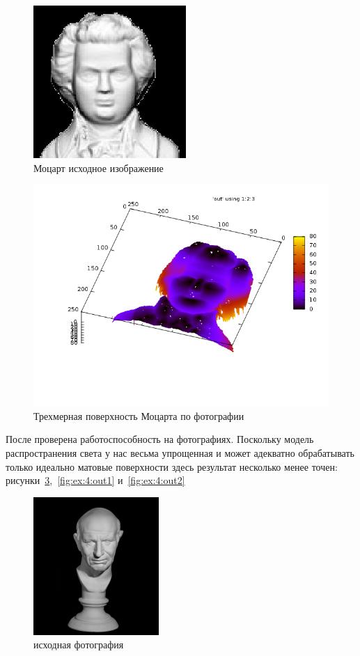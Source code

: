 \documentclass[a4paper,12pt]{article}
\begin{document}
\begin{figure}[H]
  \centering
  \includegraphics[width=0.5\linewidth]{mozart_in.png}
  \hfil \caption{Моцарт исходное изображение}
  \label{fig:ex:3:in}
\end{figure}

\begin{figure}[H]
  \centering
  \includegraphics[width=0.5\linewidth]{mozart.png}
  \hfil \caption{Трехмерная поверхность Моцарта по фотографии}
  \label{fig:ex:3:out}
\end{figure}

После проверена работоспособность на фотографиях. Поскольку модель
распространения света у нас весьма упрощенная и может адекватно
обрабатывать только идеально матовые поверхности здесь результат
несколько менее точен: рисунки~\ref{fig:ex:4:in},~\ref{fig:ex:4:out1}
и~\ref{fig:ex:4:out2}

\begin{figure}[H]
  \centering
  \includegraphics[width=0.5\linewidth]{man_in.jpg}
  \hfil \caption{исходная фотография}
  \label{fig:ex:4:in}
\end{figure}
\end{document}
